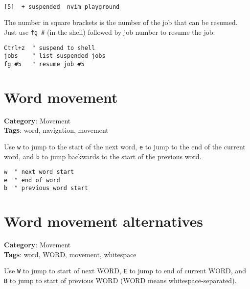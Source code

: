 {{{{{{{{\begin{Exa*}{}
\begin{Verbatim}[fontsize=\footnotesize, breaklines, breakanywhere]

[5]  + suspended  nvim playground
\end{Verbatim}
\end{Exa*}

The number in square brackets is the number of the job that can be resumed. Just use {\footnotesize \Verb§fg #§} (in the shell) followed by job number to resume the job:

\begin{Exa*}{}
\begin{Verbatim}[fontsize=\footnotesize, breaklines, breakanywhere]
Ctrl+z  " suspend to shell
jobs    " list suspended jobs
fg #5   " resume job #5
\end{Verbatim}
\end{Exa*}

\section{Word movement}

\textbf{Category}: Movement\\ \textbf{Tags}: word, navigation, movement
\vspace{0.5cm}

Use {\footnotesize \Verb§w§} to jump to the start of the next word, {\footnotesize \Verb§e§} to jump to the end of the current word, and {\footnotesize \Verb§b§} to jump backwards to the start of the previous word.

\begin{Exa*}{}
\begin{Verbatim}[fontsize=\footnotesize, breaklines, breakanywhere]
w  " next word start
e  " end of word
b  " previous word start
\end{Verbatim}
\end{Exa*}

\section{Word movement alternatives}

\textbf{Category}: Movement\\ \textbf{Tags}: word, WORD, movement, whitespace
\vspace{0.5cm}

Use {\footnotesize \Verb§W§} to jump to start of next WORD, {\footnotesize \Verb§E§} to jump to end of current WORD, and {\footnotesize \Verb§B§} to jump to start of previous WORD (WORD means whitespace-separated).

}}}}}}}}
